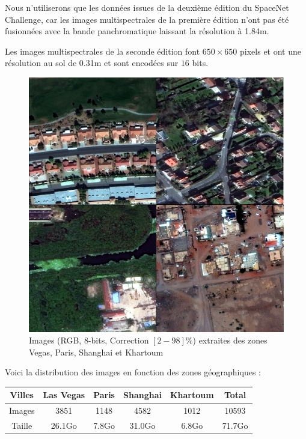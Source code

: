 \documentclass[a4paper, 11pt]{report}
\begin{document}
Nous n'utiliserons que les données issues de la deuxième édition du SpaceNet Challenge, car les images multispectrales de la première édition n'ont pas été fusionnées avec la bande panchromatique laissant la résolution à 1.84m.

Les images multispectrales de la seconde édition font $650 \times 650$ pixels et ont une résolution au sol de 0.31m et sont encodées sur $16$ bits.

\begin{figure}[H]
	\begin{center}
		\includegraphics[scale=0.175]{Images/MUL_PAN.png}
		\caption{Images (RGB, 8-bits, Correction $[2-98]\%$) extraites des zones Vegas, Paris, Shanghai et Khartoum}
	\end{center}
\end{figure}

Voici la distribution des images en fonction des zones géographiques :
\begin{center}
	 \begin{tabular}{|c|c|c|c|c|c|}
	\hline 
	Villes & Las Vegas & Paris & Shanghai & Khartoum & Total \\ 
	\hline 
	Images & 3851 & 1148 & 4582 & 1012 & 10593 \\ 
	\hline 
	Taille & 26.1Go & 7.8Go & 31.0Go & 6.8Go & 71.7Go \\ 
	\hline 
	\end{tabular}
 \end{center} 
\end{document}
